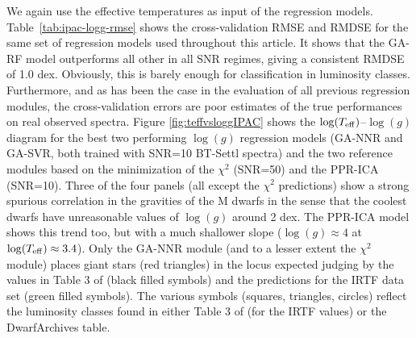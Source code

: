 We again use the effective temperatures as input of the regression
models. Table~\ref{tab:ipac-logg-rmse} shows the cross-validation RMSE
and RMDSE for the same set of regression models used throughout this
article. It shows that the GA-RF model outperforms all other in all
SNR regimes, giving a consistent RMDSE of 1.0 dex. Obviously, this is
barely enough for classification in luminosity classes. Furthermore,
and as has been the case in the evaluation of all previous regression
modules, the cross-validation errors are poor estimates of the true
performances on real observed spectra. Figure \ref{fig:teffvsloggIPAC}
shows the $\log(T_{\rm eff})$--$\log(g)$ diagram for the best two
performing $\log(g)$ regression models (GA-NNR and GA-SVR, both
trained with SNR=10 BT-Settl spectra) and the two reference modules
based on the minimization of the $\chi^2$ (SNR=50) and the PPR-ICA
(SNR=10). Three of the four panels (all except the $\chi^2$
predictions) show a strong spurious correlation in the gravities of
the M dwarfs in the sense that the coolest dwarfs have unreasonable
values of $\log(g)$ around 2 dex. The PPR-ICA model shows this trend
too, but with a much shallower slope ($\log(g)\approx 4$ at
$\log(T_{\rm eff})\approx 3.4$). Only the GA-NNR module (and to a
lesser extent the $\chi^2$ module) places giant stars (red triangles)
in the locus expected judging by the values in Table 3
of \cite{cesetti} (black filled symbols) and the predictions for the
IRTF data set (green filled symbols). The various symbols (squares,
triangles, circles) reflect the luminosity classes found in either
Table 3 of \cite{cesetti} (for the IRTF values) or the DwarfArchives
table. 


